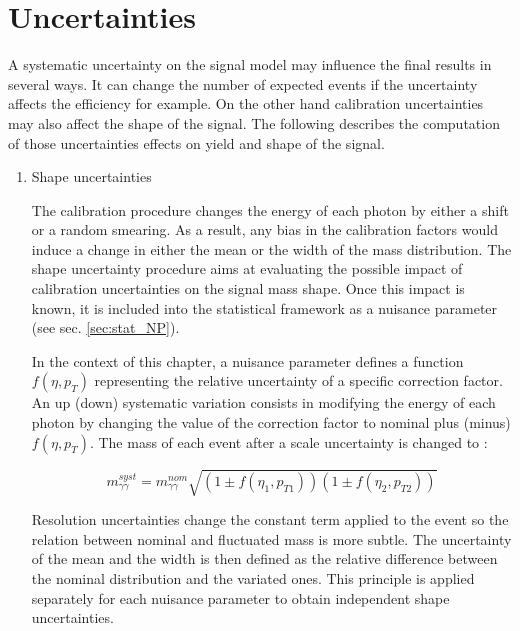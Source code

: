 \section{Uncertainties}
\label{sec:orgc59f6d5}
\label{sec:HGam_shapeUncertainties}
A systematic uncertainty on the signal model may influence the final results in several ways.
It can change the number of expected events if the uncertainty affects the efficiency for example.
On the other hand calibration uncertainties may also affect the shape of the signal.
The following describes the computation of those uncertainties effects on yield and shape of the signal.


\begin{enumerate}
\item Shape uncertainties
\label{sec:org5a47e96}


The calibration procedure changes the energy of each photon by either a shift or a random smearing.
As a result, any bias in the calibration factors would induce a change in either the mean or the width of the mass distribution.
The shape uncertainty procedure aims at evaluating the possible impact of calibration uncertainties on the signal mass shape.
Once this impact is known, it is included into the statistical framework as a nuisance parameter (see sec. \ref{sec:stat_NP}).

In the context of this chapter, a nuisance parameter defines a function $f(\eta,p_T)$ representing the relative uncertainty of a specific correction factor.
An up (down) systematic variation consists in modifying the energy of each photon by changing the value of the correction factor to nominal plus (minus) $f(\eta, p_T)$.
The mass of each event after a scale uncertainty is changed to :

\begin{equation}
m_{\gamma\gamma}^{syst} = m_{\gamma\gamma}^{nom} \sqrt{ (1\pm f(\eta_1,p_{T1}))(1\pm f(\eta_2, p_{T2}))}
\end{equation}

Resolution uncertainties change the constant term applied to the event so the relation between nominal and fluctuated mass is more subtle.
The uncertainty of the mean and the width is then defined as the relative difference between the nominal distribution and the variated ones.
This principle is applied separately for each nuisance parameter to obtain independent shape uncertainties.


\end{enumerate}
